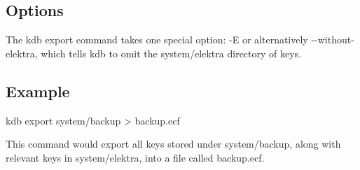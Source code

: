 \subsection*{Options}

The kdb export command takes one special option\+: {\ttfamily -\/E} or alternatively {\ttfamily -\/-\/without-\/elektra}, which tells {\ttfamily kdb} to omit the {\ttfamily system/elektra} directory of keys.

\subsection*{Example}


\begin{DoxyCode}
kdb export system/backup > backup.ecf
\end{DoxyCode}


This command would export all keys stored under {\ttfamily system/backup}, along with relevant keys in {\ttfamily system/elektra}, into a file called {\ttfamily backup.\+ecf}. 
